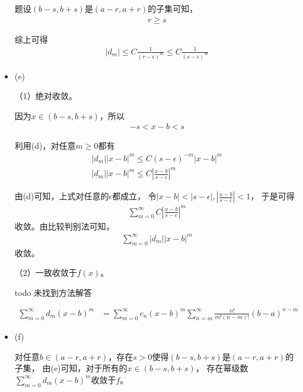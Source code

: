 \documentclass{article}
\begin{document}
\begin{itemize}
        题设$(b - s, b + s)$是$(a - r, a + r)$的子集可知，
        \begin{align*}
          r \geq s
        \end{align*}

        综上可得
        \begin{align*}
          |d_m| \leq C \frac{1}{(r - \epsilon)^{m}} \leq C \frac{1}{(s - \epsilon)^{m}}
        \end{align*}

  \item (e)

        （1）绝对收敛。

        因为$x \in (b - s, b + s)$，所以
        \begin{align*}
          -s < x - b < s
        \end{align*}

        利用(d)，对任意$m \geq 0$都有
        \begin{align*}
          |d_m||x - b|^m \leq C(s - \epsilon)^{-m} |x - b|^m \\
          |d_m||x - b|^m \leq C \left|\frac{x - b}{s - \epsilon}\right|^m
        \end{align*}

        由(d)可知，上式对任意的$\epsilon$都成立，
        令$|x - b| < |s - \epsilon|, \left|\frac{x - b}{s - \epsilon}\right| < 1$，
        于是可得
        \begin{align*}
          \sum \limits_{m = 0}^\infty C \left|\frac{x - b}{s - \epsilon}\right|^m
        \end{align*}
        收敛。由比较判别法可知，
        \begin{align*}
          \sum \limits_{m = 0}^\infty |d_m||x - b|^m
        \end{align*}
        收敛。

        （2）一致收敛于$f(x)$。

        todo 未找到方法解答

        \begin{align*}
          \sum \limits_{m = 0}^\infty d_m (x - b)^m
           & = \sum \limits_{m = 0}^\infty  c_n(x - b)^m \sum \limits_{n = m}^\infty \frac{n!}{m!(n - m)!}(b - a)^{n - m}
        \end{align*}

  \item (f)

        对任意$b \in (a -r, a + r)$，存在$s > 0$使得$(b - s, b + s)$是$(a -r, a + r)$的子集，
        由(e)可知，对于所有的$x \in (b - s, b + s)$，
        存在幂级数$\sum\limits_{m = 0}^\infty d_m (x - b)^m$收敛于$f$。

\end{itemize}
\end{document}

